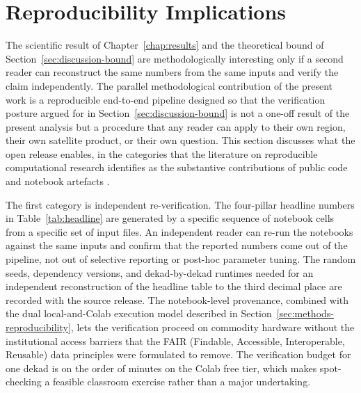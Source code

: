 \section{Reproducibility Implications}\label{sec:discussion-reproducibility}

The scientific result of Chapter~\ref{chap:results} and the
theoretical bound of Section~\ref{sec:discussion-bound} are
methodologically interesting only if a second reader can
reconstruct the same numbers from the same inputs and verify the
claim independently. The parallel methodological contribution of
the present work is a reproducible end-to-end pipeline designed so
that the verification posture argued for in
Section~\ref{sec:discussion-bound} is not a one-off result of the
present analysis but a procedure that any reader can apply to
their own region, their own satellite product, or their own
question. This section discusses what the open release enables, in
the categories that the literature on reproducible computational
research identifies as the substantive contributions of public
code and notebook artefacts \citep{ref:peng2011, ref:stodden2014}.

The first category is independent re-verification. The
four-pillar headline numbers in Table~\ref{tab:headline} are
generated by a specific sequence of notebook cells from a specific
set of input files. An independent reader can re-run the
notebooks against the same inputs and confirm that the reported
numbers come out of the pipeline, not out of selective reporting
or post-hoc parameter tuning. The random seeds, dependency
versions, and dekad-by-dekad runtimes needed for an independent
reconstruction of the headline table to the third decimal place
are recorded with the source release. The notebook-level
provenance,
combined with the dual local-and-Colab execution model described
in Section~\ref{sec:methods-reproducibility}, lets the
verification proceed on commodity hardware without the
institutional access barriers that the FAIR (Findable, Accessible,
Interoperable, Reusable) data principles
\citep{ref:wilkinson2016} were formulated to remove. The
verification budget for one dekad is on the order of minutes on
the Colab free tier, which makes spot-checking a feasible
classroom exercise rather than a major undertaking.

